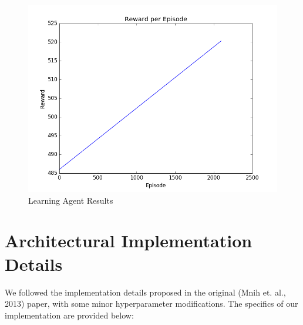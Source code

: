\documentclass[paper=a4, fontsize=11pt]{scrartcl} %
\numberwithin{equation}{section} %
\numberwithin{figure}{section} %
\numberwithin{table}{section} %
\begin{document}
\begin{figure}[h]
\includegraphics[scale=0.275]{reward_learned_line_of_best_fit}
\centering
\caption{Learning Agent Results}
\end{figure}




\section{Architectural Implementation Details}

We followed the implementation details proposed in the original (Mnih et. al., 2013) paper, with some minor hyperparameter modifications. The specifics of our implementation are provided below:
\end{document}
